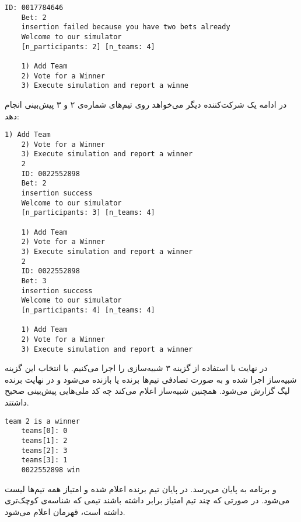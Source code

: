 \documentclass[../main.tex]{subfiles}
\begin{document}
\begin{latin}
\begin{lstlisting}[]
    ID: 0017784646
    Bet: 2
    insertion failed because you have two bets already
    Welcome to our simulator
    [n_participants: 2] [n_teams: 4]

    1) Add Team
    2) Vote for a Winner
    3) Execute simulation and report a winne
\end{lstlisting}
\end{latin}

در ادامه یک شرکت‌کننده دیگر می‌خواهد روی تیم‌های شماره‌ی ۲ و ۳ پیش‌بینی انجام دهد:

\begin{latin}
\begin{lstlisting}[]
    1) Add Team
    2) Vote for a Winner
    3) Execute simulation and report a winner
    2
    ID: 0022552898
    Bet: 2
    insertion success
    Welcome to our simulator
    [n_participants: 3] [n_teams: 4]

    1) Add Team
    2) Vote for a Winner
    3) Execute simulation and report a winner
    2
    ID: 0022552898
    Bet: 3
    insertion success
    Welcome to our simulator
    [n_participants: 4] [n_teams: 4]

    1) Add Team
    2) Vote for a Winner
    3) Execute simulation and report a winner
\end{lstlisting}
\end{latin}

در نهایت با استفاده از گزینه ۳ شبیه‌سازی را اجرا می‌کنیم.
با انتخاب این گزینه شبیه‌ساز اجرا شده و به صورت تصادفی تیم‌ها برنده یا بازنده می‌شود
و در نهایت برنده لیگ گزارش می‌شود. همچنین شبیه‌ساز اعلام می‌کند چه کد ملی‌هایی پیش‌بینی صحیح داشتند.

\begin{latin}
\begin{lstlisting}[]
    team 2 is a winner
    teams[0]: 0
    teams[1]: 2
    teams[2]: 3
    teams[3]: 1
    0022552898 win
\end{lstlisting}
\end{latin}

و برنامه به پایان می‌رسد. در پایان تیم برنده اعلام شده و امتیاز همه تیم‌ها لیست می‌شود. در صورتی که چند تیم امتیاز برابر داشته باشند
تیمی که شناسه‌ی کوچک‌تری داشته است، قهرمان اعلام می‌شود.

\end{document}
